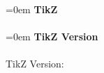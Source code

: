 \documentclass{article}
\begin{document}
\parindent=0em
\textbf{TikZ} \\ \\
\parindent=0em
\textbf{TikZ Version} \\ \\
TikZ Version: \pgfversion
\end{document}
